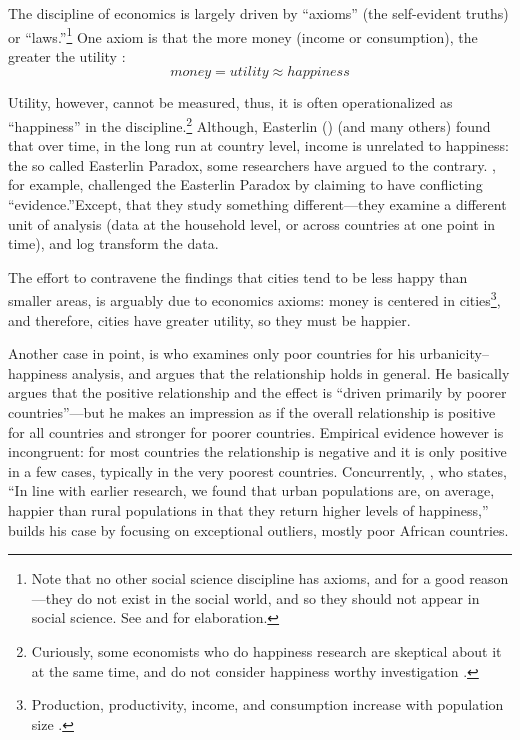 \documentclass[10pt, letterpaper]{article}
\begin{document}
%
%
The discipline of economics is largely driven by ``axioms'' (the self-evident truths)
or ``laws.''\footnote{Note that no other social science discipline has axioms, and for a good
reason---they do not exist in the social world, and so they should not appear in
social science. See \citet{feynman81} and \cite{davies18} for elaboration.} 
One axiom is that the more money (income or consumption), the greater the utility \citep[e.g.,][]{autor10}:
\begin{equation}
money = utility \approx happiness
\end{equation}%

Utility, however, cannot be measured, thus, it is often operationalized as
``happiness'' in the discipline.\footnote{Curiously, some economists who do
  happiness research are skeptical about it at the same time, and do not
  consider happiness worthy investigation
  \citep[e.g.,][]{deaton13c,glaeser14B,glaeser14}.} Although, Easterlin
(\citeyear{easterlin15B,easterlin10B}) (and many others) found that over time,
in the long run at country level, income is unrelated to happiness: the so
called Easterlin Paradox, some researchers have argued to the contrary.  \citet{stevenson13}, for example, challenged the Easterlin Paradox by claiming to have conflicting ``evidence.''Except, that they study something different---they examine a different unit of analysis (data at the household level, or across countries at one point in time), and log transform the data. 

The effort to contravene the findings that cities tend to be less happy than smaller areas, is arguably due to economics axioms: money is centered in cities\footnote{Production, productivity, income, and consumption increase with population size \cite{glaeser11C,glaeser07,glaeser01,rosenthal02,rosenthal03,rosenthal08}.}, and therefore, cities have greater utility, so they must be happier. 

Another case in point, is \citet{glaeser11} who examines only poor countries for
his urbanicity--happiness analysis, and argues that the relationship holds in
general. He basically argues that the positive relationship and the effect is
``driven primarily by poorer countries''---but he makes an impression as if the overall relationship is
positive for all countries and stronger for poorer countries. Empirical evidence however is incongruent: for most countries the relationship is negative and it is only positive in a few cases, typically in the very poorest countries. Concurrently, \citep{burger20}, who states, ``In line with earlier research, we found that
urban populations are, on average, happier than rural populations in that they return higher levels of happiness,'' builds his case by focusing on exceptional outliers, mostly poor African countries. 
\end{document}

